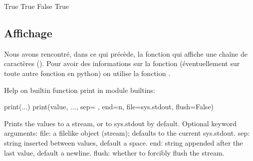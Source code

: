 \documentclass[letterpaper,10pt,french]{sphinxmanual}
\begin{document}
\begin{sphinxVerbatim}[commandchars=\\\{\}]
              

  

  

    

    
\end{sphinxVerbatim}

\begin{sphinxVerbatim}[commandchars=\\\{\}]
True
True
False
True
\end{sphinxVerbatim}


\subsection{Affichage}
\label{\detokenize{ch1:affichage}}
\sphinxAtStartPar
Nous avons rencontré, dans ce qui précède, la fonction  qui affiche une chaîne de caractères ().
Pour avoir des informations sur la fonction  (éventuellement sur toute autre fonction en python) on utilise la fonction .

\begin{sphinxVerbatim}[commandchars=\\\{\}]
\end{sphinxVerbatim}

\begin{sphinxVerbatim}[commandchars=\\\{\}]
Help on built\PYGZhy{}in function print in module builtins:

print(...)
    print(value, ..., sep=\PYGZsq{} \PYGZsq{}, end=\PYGZsq{}\PYGZbs{}n\PYGZsq{}, file=sys.stdout, flush=False)
    
    Prints the values to a stream, or to sys.stdout by default.
    Optional keyword arguments:
    file:  a file\PYGZhy{}like object (stream); defaults to the current sys.stdout.
    sep:   string inserted between values, default a space.
    end:   string appended after the last value, default a newline.
    flush: whether to forcibly flush the stream.
\end{sphinxVerbatim}
\end{document}
